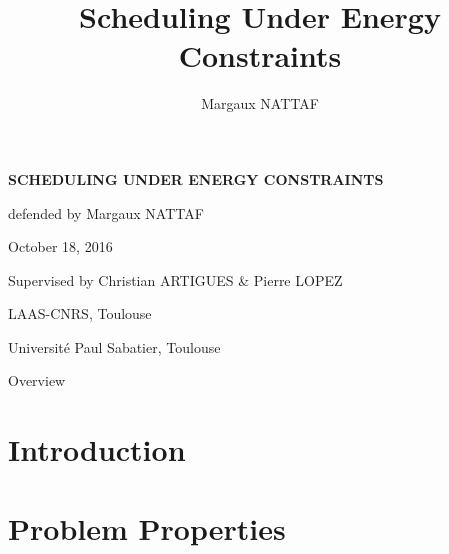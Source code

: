 \documentclass{beamer}
\title{Scheduling Under Energy Constraints}
\author{Margaux NATTAF}
\institute{LAAS-CNRS Toulouse

  Université Paul Sabatier Toulouse}
\begin{document}
{\canvasspecial
  \begin{frame}
    \vspace{1.5cm}
    \begin{flushleft}
      {\Large \bf \color{bleuLAAS}SCHEDULING UNDER ENERGY CONSTRAINTS}
      
      \vspace{0.3cm}
      \small \color{bleuLAAS!90} defended by Margaux NATTAF

      October 18, 2016
    \end{flushleft}
    \vspace{0.5cm}

    {\footnotesize  \color{bleuLAAS!80}
      Supervised by Christian ARTIGUES \& Pierre LOPEZ}

    \vspace{1.5cm}
    \begin{flushright} \color{bleuLAAS!70}
      \scriptsize LAAS-CNRS, Toulouse

      Université Paul Sabatier, Toulouse
    \end{flushright}
  \end{frame}}

\setcounter{framenumber}{0}


 \setcounter{tocdepth}{20}
 \begin{frame}{Overview}
   \tableofcontents[hideothersubsections,subsubsectionstyle={show/show/show/show}]
 \end{frame}

\section{Introduction}




\setcounter{tocdepth}{2}
\section{Problem Properties}

\end{document}
